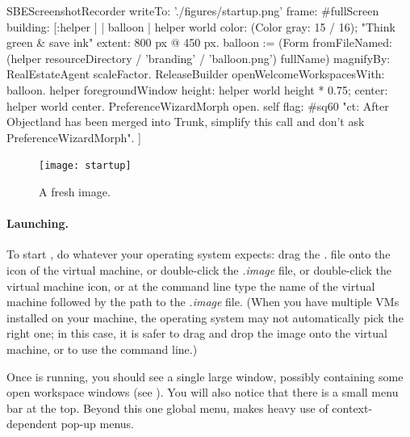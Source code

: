 \documentclass[a4paper,10pt,twoside]{book}
\begin{document}

\begin{ExecuteSmalltalkScript}
SBEScreenshotRecorder writeTo: './figures/startup.png' frame: #fullScreen building: [:helper |
	| balloon |
	helper world
		color: (Color gray: 15 / 16); "Think green & save ink"
		extent: 800 px @ 450 px.
	balloon := (Form fromFileNamed: (helper resourceDirectory
		/ 'branding' / 'balloon.png') fullName)
			magnifyBy: RealEstateAgent scaleFactor.
	ReleaseBuilder openWelcomeWorkspacesWith: balloon.
	helper foregroundWindow
		height: helper world height * 0.75;
		center: helper world center.
	PreferenceWizardMorph open.
	self flag: #sq60 "ct: After Objectland has been merged into Trunk, simplify this call and don't ask PreferenceWizardMorph".
]
\end{ExecuteSmalltalkScript}
\begin{figure}[htb]
\centerline {\texttt{[image: startup]}}
\caption{A fresh \sq image.\label{fig:startup}}
\end{figure}

\paragraph{Launching.} To start \sq, do whatever your operating system expects: drag the \emph{.} file onto the icon of the virtual machine, or double-click the \emph{.image} file, or double-click the virtual machine icon, or at the command line type the name of the virtual machine followed by the path to the \emph{.image} file.
(When you have multiple VMs installed on your machine, the operating system may not automatically pick the right one; in this case, it is safer to drag and drop the image onto the virtual machine, or to use the command line.)

Once \sq is running, you should see a single large window, possibly containing some open workspace windows (see ).
You will also notice that there is a small menu bar at the top.
Beyond this one global menu, \sq makes heavy use of context-dependent pop-up menus.

\end{document}

